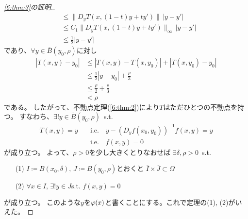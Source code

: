 \documentclass[report]{jlreq}
\begin{document}
\begin{proof}[\cref{6:thm:3}の証明.]
\begin{equation}
\begin{split}
                &\le \| D_y T(x, (1-t)y + ty') \|\, |y - y'| \\
                &\le C_1 \| D_y T(x, (1-t)y + ty') \|_\infty\, |y - y'| \\
                &\le \frac{1}{2} |y - y'|
        \end{split}
    \end{equation}
    であり、$\forall y \in \overline{B}(y_0, \rho)$に対し
    \begin{equation}
        \begin{split}
            |T(x, y) - y_0|
                &\le |T(x, y) - T(x, y_0)| + |T(x, y_0) - y_0| \\
                &\le \frac{1}{2} |y - y_0| + \frac{\rho}{3} \\
                &\le \frac{\rho}{2} + \frac{\rho}{3} \\
                &< \rho
        \end{split}
    \end{equation}
    である。
    したがって、不動点定理(\cref{6:thm:2})により$T$はただひとつの不動点を持つ。
    すなわち、$\exists! y \in \overline{B}(y_0, \rho)$\, s.t.
    \begin{equation}
        \begin{split}
            T(x, y) = y
            \quad &\text{i.e.} \quad
            y - (D_y f(x_0, y_0))^{-1} f(x, y) = y \\
            \quad &\text{i.e.} \quad
            f(x, y) = 0
        \end{split}
        \label{6:eq:5}
    \end{equation}
    が成り立つ。
    よって、$\rho > 0$を少し大きくとりなおせば
    $\exists \delta, \rho > 0$\, s.t.\,
    \begin{enumerate}
        \item[(1)] $I \coloneqq B(x_0, \delta),\,
            J \coloneqq B(y_0, \rho)$とおくと
            $\overline{I} \times \overline{J} \subset \Omega$
        \item[(2)] $\forall x \in I,\, \exists! y \in J$\quad s.t. \quad
            $f(x, y) = 0$
    \end{enumerate}
    が成り立つ。
    このような$y$を$\varphi(x)$と書くことにする。これで定理の(1), (2)がいえた。


\end{proof}
\end{document}

